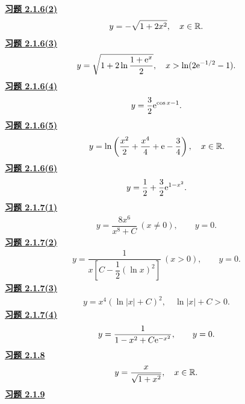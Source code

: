 \noindent\textbf{\hyperref[q:2.1.6(2)]{习题 2.1.6(2)}}
\[\begin{gathered}y=-\sqrt{1+2x^2},\quad x\in\mathbb R.\end{gathered}\]
\noindent\textbf{\hyperref[q:2.1.6(3)]{习题 2.1.6(3)}}
\[\begin{gathered}y=\sqrt{1+2\ln\dfrac{1+\mathrm e^x}{2}},\quad
 x>\ln(2\mathrm e^{-1/2}-1).\end{gathered}\]
\noindent\textbf{\hyperref[q:2.1.6(4)]{习题 2.1.6(4)}}
\[\begin{gathered}y=\dfrac32\mathrm e^{\cos x-1}.\end{gathered}\]
\noindent\textbf{\hyperref[q:2.1.6(5)]{习题 2.1.6(5)}}
\[\begin{gathered}y=\ln\left(\dfrac{x^2}{2}+\dfrac{x^4}{4}+\mathrm e-\dfrac34\right),\quad x\in\mathbb R.\end{gathered}\]
\noindent\textbf{\hyperref[q:2.1.6(6)]{习题 2.1.6(6)}}
\[\begin{gathered}y=\dfrac12+\dfrac32\mathrm e^{1-x^2}.\end{gathered}\]
\noindent\textbf{\hyperref[q:2.1.7(1)]{习题 2.1.7(1)}}
\[\begin{gathered}y=\dfrac{8x^6}{x^8+C}\ (x\ne0),\qquad y=0.\end{gathered}\]
\noindent\textbf{\hyperref[q:2.1.7(2)]{习题 2.1.7(2)}}
\[\begin{gathered}y=\dfrac1{x[C-\dfrac12(\ln x)^2]}\ (x>0),\qquad y=0.\end{gathered}\]
\noindent\textbf{\hyperref[q:2.1.7(3)]{习题 2.1.7(3)}}
\[\begin{gathered}y=x^4(\ln|x|+C)^2,\quad \ln|x|+C>0.\end{gathered}\]
\noindent\textbf{\hyperref[q:2.1.7(4)]{习题 2.1.7(4)}}
\[\begin{gathered}y=\dfrac1{1-x^2+C\mathrm e^{-x^2}},\qquad y=0.\end{gathered}\]
\noindent\textbf{\hyperref[q:2.1.8]{习题 2.1.8}}
\[\begin{gathered}y=\dfrac{x}{\sqrt{1+x^2}},\quad x\in\mathbb R.\end{gathered}\]
\noindent\textbf{\hyperref[q:2.1.9]{习题 2.1.9}}

